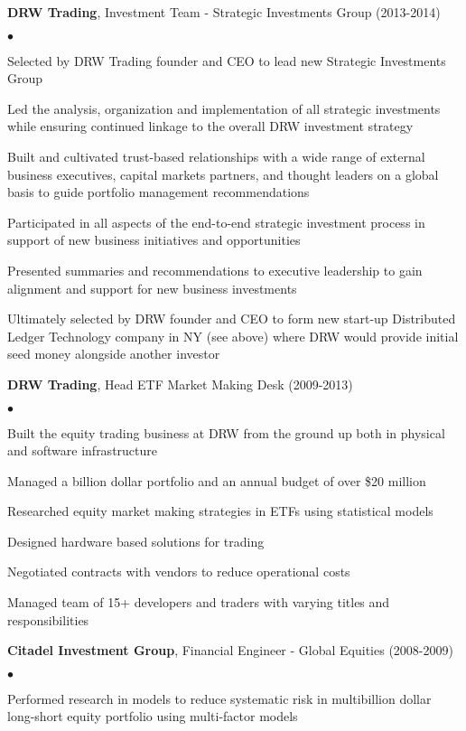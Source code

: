 \documentclass[12pt]{article}
\newcommand{\employer}[2]{{ #1 (#2) }}
\newenvironment{achievements}{\begin{list}{$\bullet$}{\topsep 0pt \itemsep -2pt}}{\vspace*{4pt}\end{list}}
\begin{document}
  \employer{\textbf{DRW Trading}, Investment Team - Strategic Investments Group}{2013-2014}
    \begin{achievements}
      \item Selected by DRW Trading founder and CEO to lead new Strategic Investments Group
      \item Led the analysis, organization and implementation of all strategic
            investments while ensuring continued linkage to the overall DRW investment strategy
      \item Built and cultivated trust-based relationships with a wide range of
            external business executives, capital markets partners, and thought
            leaders on a global basis to guide portfolio management recommendations
      \item Participated in all aspects of the end-to-end strategic investment
            process in support of new business initiatives and opportunities
      \item Presented summaries and recommendations to executive leadership to
            gain alignment and support for new business investments
      \item Ultimately selected by DRW founder and CEO to form new start-up
            Distributed Ledger Technology company in NY (see above) where DRW
            would provide initial seed money alongside another investor
    \end{achievements}

  \employer{\textbf{DRW Trading}, Head ETF Market Making Desk}{2009-2013}
    \begin{achievements}
      \item Built the equity trading business at DRW from the ground up both in
            physical and software infrastructure
      \item Managed a billion dollar portfolio and an annual budget of over \$20 million
      \item Researched equity market making strategies in ETFs using statistical models
      \item Designed hardware based solutions for trading
      \item Negotiated contracts with vendors to reduce operational costs
      \item Managed team of 15+ developers and traders with varying titles and responsibilities
    \end{achievements}

  \employer{\textbf{Citadel Investment Group}, Financial Engineer - Global Equities}{2008-2009}
    \begin{achievements}
      \item Performed research in models to reduce systematic risk in multibillion
            dollar long-short equity portfolio using multi-factor models
    \end{achievements}
\end{document}
